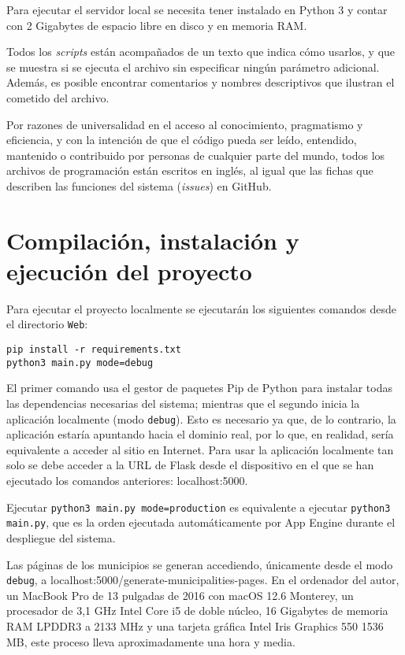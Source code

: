 Para ejecutar el servidor local se necesita tener instalado en Python 3 y contar con 2 Gigabytes de espacio libre en disco y en memoria RAM.

Todos los \textit{scripts} están acompañados de un texto que indica cómo usarlos, y que se muestra si se ejecuta el archivo sin especificar ningún parámetro adicional. Además, es posible encontrar comentarios y nombres descriptivos que ilustran el cometido del archivo.

Por razones de universalidad en el acceso al conocimiento, pragmatismo y eficiencia, y con la intención de que el código pueda ser leído, entendido, mantenido o contribuido por personas de cualquier parte del mundo, todos los archivos de programación están escritos en inglés, al igual que las fichas que describen las funciones del sistema (\textit{issues}) en GitHub.

\section{Compilación, instalación y ejecución del proyecto}

Para ejecutar el proyecto localmente se ejecutarán los siguientes comandos desde el directorio \texttt{Web}:

\begin{verbatim}
pip install -r requirements.txt
python3 main.py mode=debug
\end{verbatim}

El primer comando usa el gestor de paquetes Pip de Python para instalar todas las dependencias necesarias del sistema; mientras que el segundo inicia la aplicación localmente (modo \texttt{debug}). Esto es necesario ya que, de lo contrario, la aplicación estaría apuntando hacia el dominio real, por lo que, en realidad, sería equivalente a acceder al sitio en Internet. Para usar la aplicación localmente tan solo se debe acceder a la URL de Flask desde el dispositivo en el que se han ejecutado los comandos anteriores: localhost:5000.

Ejecutar \texttt{python3 main.py mode=production} es equivalente a ejecutar \texttt{python3 main.py}, que es la orden ejecutada automáticamente por App Engine durante el despliegue del sistema.

Las páginas de los municipios se generan accediendo, únicamente desde el modo \texttt{debug}, a localhost:5000/generate-municipalities-pages. En el ordenador del autor, un MacBook Pro de 13 pulgadas de 2016 con macOS 12.6 Monterey, un procesador de 3,1 GHz Intel Core i5 de doble núcleo, 16 Gigabytes de memoria RAM LPDDR3 a 2133 MHz y una tarjeta gráfica Intel Iris Graphics 550 1536 MB, este proceso lleva aproximadamente una hora y media.

